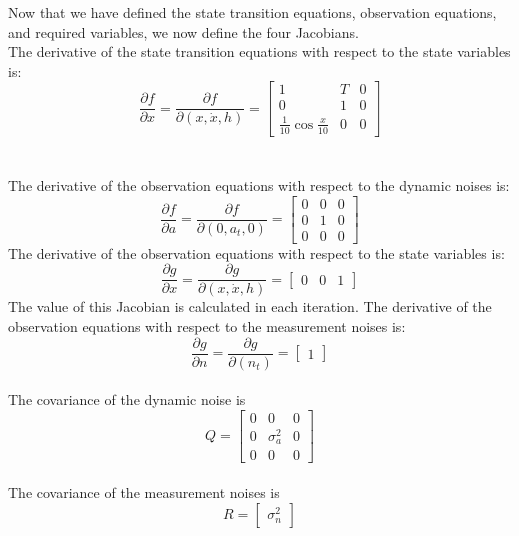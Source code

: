 \documentclass{article}
\begin{document}
Now that we have defined the state transition equations, observation equations, and required variables, we now define the four Jacobians.
\\ \indent
The derivative of the state transition equations with respect to the state variables is: 
\begin{equation}
\label{eq: dfdx}
\frac{\partial f}{\partial x} =
\frac{\partial f}{\partial (x,\dot{x},h)} =
\begin{bmatrix}
1 & T & 0  \\
0 & 1 & 0  \\
\frac{1}{10} \cos \frac{x}{10} & 0 & 0 
\end{bmatrix}
\end{equation} \\
\\ \indent
The derivative of the observation equations with respect to the dynamic noises is:
\begin{equation}
\label{eq: dfda}
\frac{\partial f}{\partial a} =
\frac{\partial f}{\partial (0,a_t,0)} =
\begin{bmatrix}
0 & 0 & 0  \\
0 & 1 & 0  \\
0 & 0 & 0 
\end{bmatrix} 
\end{equation}
\indent
The derivative of the observation equations with respect to the state variables is:
\begin{equation}
\label{eq: dgdx}
\frac{\partial g}{\partial x} =
\frac{\partial g}{\partial (x,\dot{x},h)} =
\begin{bmatrix}
0 & 0 & 1
\end{bmatrix}
\end{equation}
The value of this Jacobian is calculated in each iteration. 
\indent
The derivative of the observation equations with respect to the measurement noises is:
\begin{equation}
\label{eq: dgdn}
\frac{\partial g}{\partial n} =
\frac{\partial g}{\partial (n_t)} =
\begin{bmatrix}
1 
\end{bmatrix}
\end{equation}
\\ \indent
The covariance of the dynamic noise is
\begin{equation}
Q = \begin{bmatrix}
0 & 0 & 0  \\
0 & \sigma_a^2 & 0  \\
0 & 0 & 0 
\end{bmatrix}
\label{eq: Q}
\end{equation}
\\ \indent
The covariance of the measurement noises is
\begin{equation}
R = \begin{bmatrix}
\sigma_n^2
\end{bmatrix}
\label{eq: R}
\end{equation}
\end{document}
